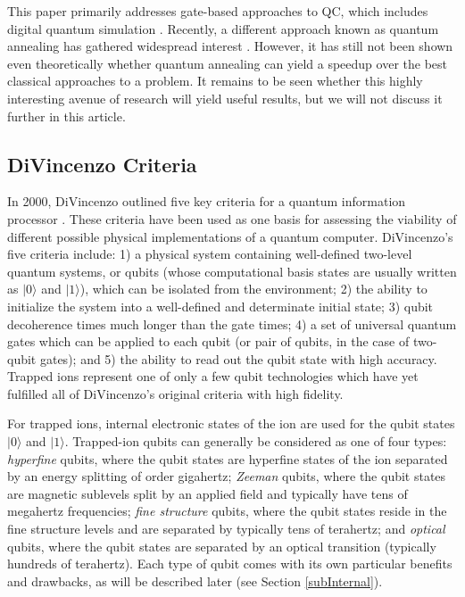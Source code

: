 \documentclass[%
reprint,
 amsmath,amssymb,
]{revtex4-1}
\newcommand{\zero}{|0 \rangle}
\newcommand{\one}{|1 \rangle}
\begin{document}
This paper primarily addresses gate-based approaches to QC, which includes digital quantum simulation \cite{UniversalQSimLloyd1996}. Recently, a different approach known as quantum annealing has gathered widespread interest \cite{JohnsonQuantumAnneal2011, BoixoQuantumAnneal100Qubits2014}. However, it has still not been shown even theoretically whether quantum annealing can yield a speedup over the best classical approaches to a problem. It remains to be seen whether this highly interesting avenue of research will yield useful results, but we will not discuss it further in this article.

\subsection{DiVincenzo Criteria}
\label{sec:DiV_criteria}

In 2000, DiVincenzo outlined five key criteria for a quantum information processor \cite{DiVincenzoCriteria2000}. These criteria have been used as one basis for assessing the viability of different possible physical implementations of a quantum computer. DiVincenzo's five criteria include: 1) a physical system containing well-defined two-level quantum systems, or qubits (whose computational basis states are usually written as $\zero$ and $\one$), which can be isolated from the environment; 2) the ability to initialize the system into a well-defined and determinate initial state; 3) qubit decoherence times much longer than the gate times; 4) a set of universal quantum gates which can be applied to each qubit (or pair of qubits, in the case of two-qubit gates); and 5) the ability to read out the qubit state with high accuracy. Trapped ions represent one of only a few qubit technologies which have yet fulfilled all of DiVincenzo's original criteria with high fidelity.

For trapped ions, internal electronic states of the ion are used for the qubit states $\zero$ and $\one$. Trapped-ion qubits can generally be considered as one of four types: \emph{hyperfine} qubits, where the qubit states are hyperfine states of the ion separated by an energy splitting of order gigahertz; \emph{Zeeman} qubits, where the qubit states are magnetic sublevels split by an applied field and typically have tens of megahertz frequencies; \emph{fine structure} qubits, where the qubit states reside in the fine structure levels and are separated by typically tens of terahertz; and \emph{optical} qubits, where the qubit states are separated by an optical transition (typically hundreds of terahertz). Each type of qubit comes with its own particular benefits and drawbacks, as will be described later (see Section \ref{subInternal}).
\end{document}
